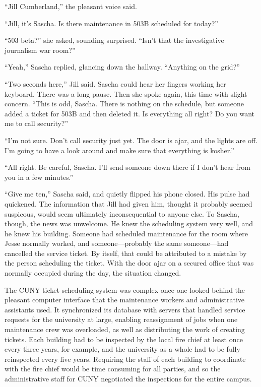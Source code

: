\documentclass[12pt]{book}
\begin{document}
``Jill Cumberland,'' the pleasant voice said.

``Jill, it's Sascha.  Is there maintenance in 503B scheduled for today?''

``503 beta?'' she asked, sounding surprised.  ``Isn't that the investigative journalism war room?''

``Yeah,'' Sascha replied, glancing down the hallway.  ``Anything on the grid?''

``Two seconds here,'' Jill said.  Sascha could hear her fingers working her keyboard.  There was a long pause.  Then she spoke again, this time with slight concern.  ``This is odd, Sascha.  There is nothing on the schedule, but someone added a ticket for 503B and then deleted it.  Is everything all right?  Do you want me to call security?''

``I'm not sure.  Don't call security just yet.  The door is ajar, and the lights are off.  I'm going to have a look around and make sure that everything is kosher.''

``All right.  Be careful, Sascha.  I'll send someone down there if I don't hear from you in a few minutes.''

``Give me ten,'' Sascha said, and quietly flipped his phone closed.  His pulse had quickened.  The information that Jill had given him, thought it probably seemed suspicous, would seem ultimately inconsequential to anyone else.  To Sascha, though, the news was unwelcome.  He knew the scheduling system very well, and he knew his building.  Someone had scheduled maintenance for the room where Jesse normally worked, and someone---probably the same someone---had cancelled the service ticket.  By itself, that could be attributed to a mistake by the person scheduling the ticket.  With the door ajar on a secured office that was normally occupied during the day, the situation changed.


The CUNY ticket scheduling system was complex once one looked behind the pleasant computer interface that the maintenance workers and administrative assistants used.  It synchronized its database with servers that handled service requests for the university at large, enabling reassignment of jobs when one maintenance crew was overloaded, as well as distributing the work of creating tickets.  Each building had to be inspected by the local fire chief at least once every three years, for example, and the university as a whole had to be fully reinspected every five years.  Requiring the staff of each building to coordinate with the fire chief would be time consuming for all parties, and so the administrative staff for CUNY negotiated the inspections for the entire campus.
\end{document}

